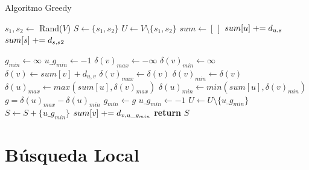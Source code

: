 \begin{algorithm}[H]
\caption{Algoritmo Greedy}
\begin{algorithmic}[1]
\State $s_1, s_2 \gets$ Rand($V$) 
\State $S \gets \{s_1,s_2\}$
\State $U \gets V \setminus \{s_1,s_2\}$  
\State 
\State $sum \gets [ \, ]$ 
 
        \State $sum[u] \mathrel{+}= d_{u,s}$
    \EndFor
\EndFor
{}
        \State $sum[s] \mathrel{+}= d_{s,s2}$
    \EndFor
\EndFor
{}
\end{algorithmic}
\end{algorithm}

\begin{algorithm}[H]
\begin{algorithmic}
 
    \State $g_{min} \gets \infty$
    \State $u\_g_{min} \gets -1$
    \State
        \State $\delta(v)_{max} \gets -\infty$
        \State $\delta(v)_{min} \gets \infty$
        \State
            \State $\delta(v) \gets sum[v] + d_{u,v}$
                \State $\delta(v)_{max} \gets \delta(v)$
            \EndIf
                \State $\delta(v)_{min} \gets \delta(v)$
            \EndIf
            \State
            \State $\delta(u)_{max} \gets max(sum[u], \delta(v)_{max})$
            \State $\delta(u)_{min} \gets min(sum[u], \delta(v)_{min})$
            \State $g = \delta(u)_{max} - \delta(u)_{min}$
                \State $g_{min} \gets g$
                \State $u\_g_{min} \gets -1$
            \EndIf
        \EndFor
        \State
        \State $U \gets U \setminus \{u\_g_{min}\}$
        \State $S \gets S + \{u\_g_{min}\}$
    \EndFor
    \State
        \State $sum[v] \mathrel{+}= d_{v,u\_g_{min}}$
    \EndFor
\EndWhile
\State
\State \textbf{return} $S$ 
\end{algorithmic}
\end{algorithm}

\newpage
\section{Búsqueda Local}

